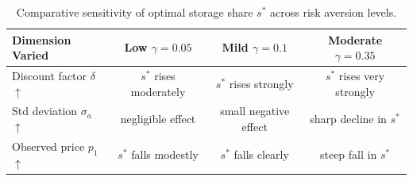 \begin{table}[h!]
\centering
\begin{tabular}{lccc}
\toprule
Dimension Varied & Low $\gamma=0.05$ & Mild $\gamma=0.1$ & Moderate $\gamma=0.35$ \\
\midrule
Discount factor $\delta$ $\uparrow$ & $s^*$ rises moderately & $s^*$ rises strongly & $s^*$ rises very strongly \\
Std deviation $\sigma_a$ $\uparrow$ & negligible effect & small negative effect & sharp decline in $s^*$ \\
Observed price $p_1$ $\uparrow$ & $s^*$ falls modestly & $s^*$ falls clearly & steep fall in $s^*$ \\
\bottomrule
\end{tabular}
\caption{Comparative sensitivity of optimal storage share $s^*$ across risk aversion levels.}
\end{table}

